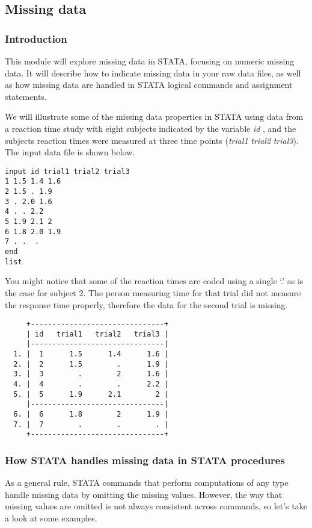 \subsection{Missing data}
\subsubsection{Introduction}

This module will explore missing data in STATA, focusing on numeric missing data. It will describe how to indicate missing data in your raw data files, as well as how missing data are handled in STATA logical commands and assignment statements.

We will illustrate some of the missing data properties in STATA using data from a reaction time study with eight subjects indicated by the variable \textit{id} , and the subjects reaction times were measured at three time points (\textit{trial1} \textit{trial2} \textit{trial3}). The input data file is shown below.

\begin{lstlisting}
input id trial1 trial2 trial3
1 1.5 1.4 1.6
2 1.5 . 1.9
3 . 2.0 1.6
4 . . 2.2
5 1.9 2.1 2
6 1.8 2.0 1.9
7 . .  .
end
list
\end{lstlisting}

You might notice that some of the reaction times are coded using a single `.' as is the case for subject 2. The person measuring time for that trial did not measure the response time properly, therefore the data for the second trial is missing.

\begin{lstlisting}
     +-------------------------------+
     | id   trial1   trial2   trial3 |
     |-------------------------------|
  1. |  1      1.5      1.4      1.6 |
  2. |  2      1.5        .      1.9 |
  3. |  3        .        2      1.6 |
  4. |  4        .        .      2.2 |
  5. |  5      1.9      2.1        2 |
     |-------------------------------|
  6. |  6      1.8        2      1.9 |
  7. |  7        .        .        . |
     +-------------------------------+
\end{lstlisting}

\subsubsection{How STATA handles missing data in STATA procedures}

As a general rule, STATA commands that perform computations of any type handle  missing data by omitting the missing values. However, the way that missing values are omitted is not always consistent across commands, so let's take a look at some examples.


